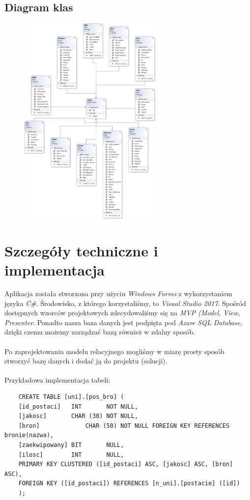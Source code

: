 \documentclass{article}
\begin{document}
\subsection*{Diagram klas}
\begin{figure}[h!]
\begin{center}
    
\centering
\includegraphics[height=400px]{Diagram_klas_UML.png}

\end{center}
\end{figure}

\newpage
\section{Szczegóły techniczne i implementacja}
Aplikacja została stworzona przy użyciu \textit{Windows Forms} z wykorzystaniem języka \textit{C\#}. Środowisko, z którego korzystaliśmy, to \textit{Visual Studio 2017}. Spośród dostępnych wzorców projektowych zdecydowaliśmy się na \textit{MVP (Model, View, Presenter}. Ponadto nasza baza danych jest podpięta pod \textit{Azure SQL Database}, dzięki czemu możemy zarządzać bazą również w zdalny sposób.
\\\\Po zaprojektowaniu modelu relacyjnego mogliśmy w miarę prosty sposób stworzyć bazę danych i dodać ją do projektu (solucji).
\\\\Przykładowa implementacja tabeli:
\begin{verbatim}
    CREATE TABLE [uni].[pos_bro] (
    [id_postaci]   INT       NOT NULL,
    [jakosc]       CHAR (30) NOT NULL,
    [bron]	    	   CHAR (50) NOT NULL FOREIGN KEY REFERENCES bronie(nazwa),
    [zaekwipowany] BIT       NULL,
    [ilosc]        INT       NULL,
    PRIMARY KEY CLUSTERED ([id_postaci] ASC, [jakosc] ASC, [bron] ASC),
    FOREIGN KEY ([id_postaci]) REFERENCES [n_uni].[postacie] ([id])
    );
\end{verbatim}
\end{document}
